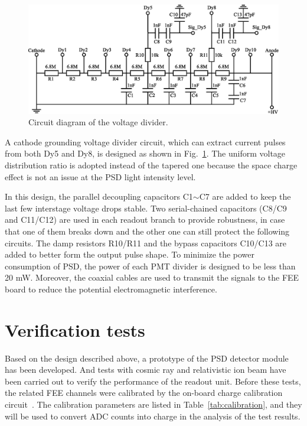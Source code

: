 \documentclass[preprint, times]{elsarticle}
\begin{document}
\begin{figure}
\centering
 \includegraphics[width=130mm]{divider}
\caption{Circuit diagram of the voltage divider.}
\label{fig:divider}
\end{figure}

A cathode grounding voltage divider circuit, which can extract current pulses from both Dy5 and Dy8, is designed as shown in Fig.~\ref{fig:divider}.
The uniform voltage distribution ratio is adopted instead of the tapered one because the space charge effect is not an issue at the PSD light intensity level.

In this design, the parallel decoupling capacitors C1$\sim$C7 are added to keep the last few interstage voltage drops stable. Two serial-chained capacitors (C8/C9 and C11/C12) are used in each readout branch to provide robustness, in case that one of them breaks down and the other one can still protect the following circuits. 
The damp resistors R10/R11 and the bypass capacitors C10/C13 are added to better form the output pulse shape. 
To minimize the power consumption of PSD, the power of each PMT divider is designed to be less than 20 mW. 
Moreover, the coaxial cables are used to transmit the signals to the FEE board to reduce the potential electromagnetic interference.


\section{Verification tests}
\label{sec:result}
Based on the design described above, a prototype of the PSD detector module has been developed.
And tests with cosmic ray and relativistic ion beam have been carried out to verify the performance of the readout unit.
Before these tests, the related FEE channels were calibrated by the on-board charge calibration circuit~\cite{fee}.
The calibration parameters are listed in Table~\ref{tab:calibration}, and they will be used to convert ADC counts into charge in the analysis of the test results.
\end{document}

